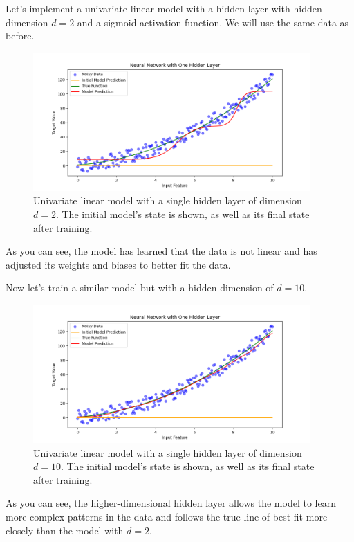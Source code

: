 Let's implement a univariate linear model with a hidden layer with hidden dimension $d=2$ and a sigmoid activation function. We will use the same data as before.



\begin{figure}[H]
\centering
\includegraphics[width=300pt]{Regression/code/neural-network1.png}
\caption{Univariate linear model with a single hidden layer of dimension $d=2$. The initial model's state is shown, as well as its final state after training.}
\label{fig:linear10}
\end{figure}

As you can see, the model has learned that the data is not linear and has adjusted its weights and biases to better fit the data. 

Now let's train a similar model but with a hidden dimension of $d=10$.



\begin{figure}[H]
\centering
\includegraphics[width=300pt]{Regression/code/neural-network2.png}
\caption{Univariate linear model with a single hidden layer of dimension $d=10$. The initial model's state is shown, as well as its final state after training.}
\label{fig:linear11}
\end{figure}

As you can see, the higher-dimensional hidden layer allows the model to learn more complex patterns in the data and follows the true line of best fit more closely than the model with $d=2$.

%
